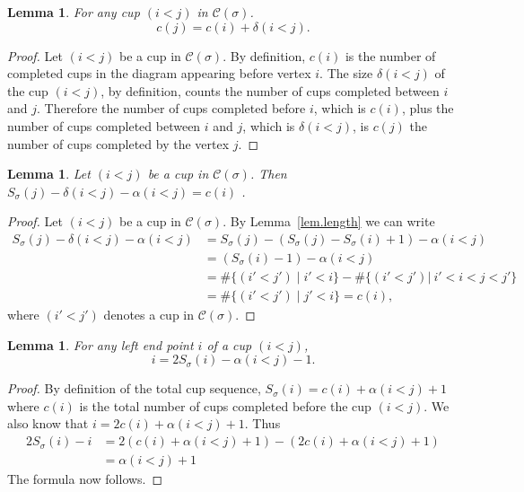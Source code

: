 \documentclass[11pt]{amsart}
\newtheorem{lemma}[theorem]{Lemma}
\theoremstyle{remark}
\theoremstyle{remark}
\theoremstyle{definition}
\theoremstyle{definition}
\theoremstyle{definition}
\numberwithin{equation}{section}
\newcommand{\ga}{\alpha}
\newcommand{\gd}{\delta}
\newcommand{\gs}{\sigma}
\newcommand{\cc}{\mathcal{C}}
\newcommand{\al}{\alpha}
\newcommand{\cupsigma}{\cc(\gs)}
\begin{document}
\begin{lemma}\label{lem.rightend}
For any cup $(i<j)$ in $\cupsigma$. 
\begin{equation}
c(j)=c(i)+\gd(i<j).
\end{equation}
\end{lemma}
\begin{proof}
Let $(i<j)$ be a cup in $\cupsigma$. By definition, $c(i)$ is the number of completed cups in the diagram appearing before vertex $i$. The size $\gd(i<j)$  of the cup $(i<j)$, by definition, counts the number of cups completed between $i$ and $j$. Therefore the number of cups completed before $i$, which is $c(i)$, plus the number of cups completed between $i$ and $j$, which is $\gd(i<j)$, is $c(j)$ the number of cups completed by the vertex $j$.
\end{proof}

\begin{lemma} \label{lemma.completedcups} Let $(i<j)$ be a cup in $\cupsigma$. Then $S_\gs(j)-\delta(i<j)-\alpha(i<j)=c(i)$ .  
\end{lemma}
\begin{proof}
Let $(i<j)$ be a cup in $\cupsigma$.  
By Lemma~\ref{lem.length} we can write
    \begin{equation*}
        \begin{split}
          S_\gs(j)-\gd(i<j)-\alpha(i<j) &=  S_\gs(j)- \left(S_\gs(j)-S_\gs(i)+1\right)-\alpha(i<j)\\
           & = (S_\gs(i)-1)-\ga(i<j)  \\
        & = \#\{(i'<j')\mid i'<i \}-\#\{(i'<j')|~i'<i<j<j'\}\\
        &=\#\{(i'<j')\mid j'<i\}=c(i),
    \end{split}
\end{equation*}
where $(i'<j')$ denotes a cup in $\cupsigma$. 

\end{proof}





\begin{lemma} \label{lem.leftend} For any left end point $i$ of a cup $(i<j)$,
\begin{equation}\label{rem:i}
    i=2S_\gs(i)-\ga(i<j)-1.
\end{equation}
\end{lemma}

\begin{proof} 
By definition of the total cup sequence, $S_\gs(i) = c(i) + \al(i<j)+1$ where $c(i)$ is the total number of cups completed before the cup $(i<j)$. We also know that $i=2c(i)+\al(i<j)+1$. Thus
\begin{equation*}\label{eqn.cup.above}
\begin{split}
2S_\gs(i)-i &= 2\left( c(i)+ \al(i<j)+1\right) - \left(2c(i)+\al(i<j)+1\right)\\
&= \al(i<j)+1 
\end{split}
\end{equation*}
The formula now follows.
\end{proof}
\end{document}
